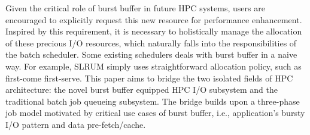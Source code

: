 

Given the critical role of burst buffer in future HPC systems,
users are encouraged to explicitly request this new resource for performance enhancement\cite{apex-workflow}.
Inspired by this requirement, it is necessary to holistically manage
the allocation of these precious I/O resources,
which naturally falls into the responsibilities of the batch scheduler.
Some existing schedulers deals with burst buffer\cite{Moab, Cobalt} in a naive way.
For example, SLRUM simply uses straightforward allocation policy,
such as first-come first-serve\cite{SlurmBBGuide}.
This paper aims to bridge the two isolated fields of HPC architecture:
the novel burst buffer equipped HPC I/O subsystem and the
traditional batch job queueing subsystem.
The bridge builds upon a three-phase job model motivated by critical use cases of burst buffer,
i.e., application's bursty I/O pattern and data pre-fetch/cache.

